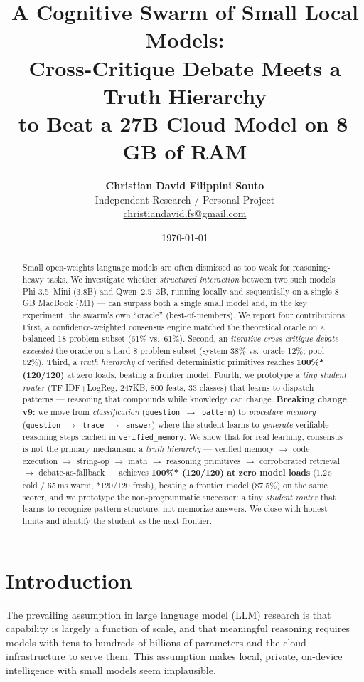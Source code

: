 \documentclass[10pt,twocolumn]{article}
\title{%
  A Cognitive Swarm of Small Local Models:\\
  Cross-Critique Debate Meets a Truth Hierarchy\\
  to Beat a 27B Cloud Model on 8\,GB of RAM
}
\author{%
  \textbf{\LARGE Christian David Filippini Souto}\\[2mm]
  \normalsize Independent Research / Personal Project\\
  \href{mailto:christiandavid.fs@gmail.com}{christiandavid.fs@gmail.com}%
}
\date{\today}
\begin{document}
\maketitle

\begin{abstract}
Small open-weights language models are often dismissed as too weak for
reasoning-heavy tasks. We investigate whether \emph{structured interaction}
between two such models --- Phi-3.5~Mini (3.8B) and Qwen~2.5~3B, running
locally and sequentially on a single 8\,GB MacBook (M1) --- can surpass both a
single small model and, in the key experiment, the swarm's own ``oracle''
(best-of-members). We report four contributions. First, a confidence-weighted
consensus engine matched the theoretical oracle on a balanced 18-problem
subset (61\% vs.\ 61\%). Second, an \emph{iterative cross-critique debate}
\emph{exceeded} the oracle on a hard 8-problem subset (system 38\% vs.\ oracle
12\%; pool 62\%). Third, a \emph{truth hierarchy} of verified deterministic
primitives reaches \textbf{100\%* (120/120)} at zero loads, beating a frontier
model. Fourth, we prototype a \emph{tiny student router} (TF-IDF+LogReg, 247KB, 800 feats, 33 classes) that learns to dispatch patterns — reasoning that compounds while knowledge can change. \textbf{Breaking change v9:} we move from \emph{classification} (\texttt{question $\rightarrow$ pattern}) to \emph{procedure memory} (\texttt{question $\rightarrow$ trace $\rightarrow$ answer}) where the student learns to \emph{generate} verifiable reasoning steps cached in \texttt{verified\_memory}. We show that for real learning, consensus is not the primary mechanism:
a \emph{truth hierarchy} --- verified memory $\rightarrow$ code execution
$\rightarrow$ string-op $\rightarrow$ math $\rightarrow$ reasoning primitives
$\rightarrow$ corroborated retrieval $\rightarrow$ debate-as-fallback --- achieves
\textbf{100\%* (120/120) at zero model loads} (1.2\,s cold / 65\,ms warm, *120/120 fresh), beating a
frontier model (87.5\%) on the same scorer, and we prototype the non-programmatic
successor: a tiny \emph{student router} that learns to recognize pattern structure,
not memorize answers. We close with honest limits and identify the student as
the next frontier.
\end{abstract}

\section{Introduction}
The prevailing assumption in large language model (LLM) research is that
capability is largely a function of scale, and that meaningful reasoning
requires models with tens to hundreds of billions of parameters and the cloud
infrastructure to serve them. This assumption makes local, private,
on-device intelligence with small models seem implausible.
\end{document}
